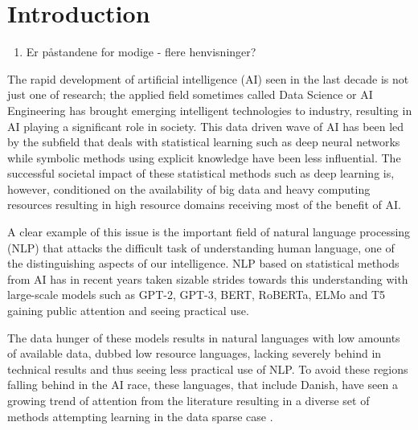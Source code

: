 \documentclass[main.tex]{subfiles}
\begin{document}
\chapter{Introduction}
\begin{enumerate}
    \item Er påstandene for modige - flere henvisninger?
\end{enumerate}
The rapid development of artificial intelligence (AI) seen in the last decade is not just one of research;
the applied field sometimes called Data Science or AI Engineering has brought emerging intelligent technologies to industry, resulting in AI playing a significant role in society.  This data driven wave of AI has been led by the subfield that deals with statistical learning such as deep neural networks while symbolic methods using explicit knowledge have been less influential.
The successful societal impact of these statistical methods such as deep learning is, however, conditioned on the availability of big data and heavy computing resources resulting in high resource domains receiving most of the benefit of AI.

A clear example of this issue is the important field of natural language processing (NLP) that attacks the difficult task of understanding human language, one of the distinguishing aspects of our intelligence.
NLP based on statistical methods from AI has in recent years taken sizable strides towards this understanding with large-scale models such as GPT-2, GPT-3, BERT, RoBERTa, ELMo and T5 gaining public attention and seeing practical use.

The data hunger of these models results in natural languages with low amounts of available data, dubbed low resource languages, lacking severely behind in technical results and thus seeing less practical use of NLP.
To avoid these regions falling behind in the AI race, these languages, that include Danish, have seen a growing trend of attention from the literature resulting in a diverse set of methods attempting learning in the data sparse case \cite{hedderich2021survey}.
\end{document}
